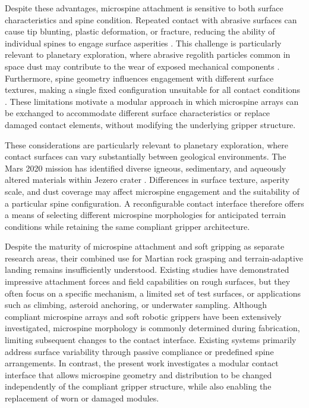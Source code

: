 \documentclass[letterpaper, 10 pt, conference, twoside]{ieeetran}
\begin{document}
Despite these advantages, microspine attachment is sensitive to both surface characteristics and spine condition. Repeated contact with abrasive surfaces can cause tip blunting, plastic deformation, or fracture, reducing the ability of individual spines to engage surface asperities \cite{Li2023MicrospineGripper}. This challenge is particularly relevant to planetary exploration, where abrasive regolith particles common in space dust may contribute to the wear of exposed mechanical components \cite{Kalacska2024RegolithAbrasion}. Furthermore, spine geometry influences engagement with different surface textures, making a single fixed configuration unsuitable for all contact conditions \cite{Jiang2018StochasticModels}. These limitations motivate a modular approach in which microspine arrays can be exchanged to accommodate different surface characteristics or replace damaged contact elements, without modifying the underlying gripper structure.

These considerations are particularly relevant to planetary exploration, where contact surfaces can vary substantially between geological environments. The Mars 2020 mission has identified diverse igneous, sedimentary, and aqueously altered materials within Jezero crater \cite{Farley2020Mars2020,Mangold2021JezeroDelta,Farley2022JezeroIgneous}. Differences in surface texture, asperity scale, and dust coverage may affect microspine engagement and the suitability of a particular spine configuration. A reconfigurable contact interface therefore offers a means of selecting different microspine morphologies for anticipated terrain conditions while retaining the same compliant gripper architecture.

Despite the maturity of microspine attachment and soft gripping as separate research areas, their combined use for Martian rock grasping and terrain-adaptive landing remains insufficiently understood. Existing studies have demonstrated impressive attachment forces and field capabilities on rough surfaces, but they often focus on a specific mechanism, a limited set of test surfaces, or applications such as climbing, asteroid anchoring, or underwater sampling. Although compliant microspine arrays and soft robotic grippers have been extensively investigated, microspine morphology is commonly determined during fabrication, limiting subsequent changes to the contact interface. Existing systems primarily address surface variability through passive compliance or predefined spine arrangements. In contrast, the present work investigates a modular contact interface that allows microspine geometry and distribution to be changed independently of the compliant gripper structure, while also enabling the replacement of worn or damaged modules.
\end{document}
